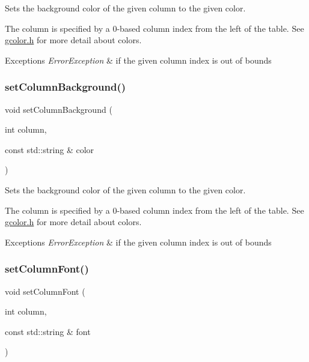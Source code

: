 Sets the background color of the given column to the given color. 

The column is specified by a 0-\/based column index from the left of the table. See \mbox{\hyperlink{gcolor_8h_source}{gcolor.\+h}} for more detail about colors. 
\begin{DoxyExceptions}{Exceptions}
{\em Error\+Exception} & if the given column index is out of bounds \\
\hline
\end{DoxyExceptions}
\mbox{\label{classGTable_a37fd3b921a5fba28b84dd4dd17fa9930}} 
\subsubsection{\texorpdfstring{set\+Column\+Background()}{setColumnBackground()}\hspace{0.1cm}{\footnotesize\ttfamily [2/2]}}
{\footnotesize\ttfamily void set\+Column\+Background (\begin{DoxyParamCaption}\item[{int}]{column,  }\item[{const std\+::string \&}]{color }\end{DoxyParamCaption})\hspace{0.3cm}{\ttfamily [virtual]}}



Sets the background color of the given column to the given color. 

The column is specified by a 0-\/based column index from the left of the table. See \mbox{\hyperlink{gcolor_8h_source}{gcolor.\+h}} for more detail about colors. 
\begin{DoxyExceptions}{Exceptions}
{\em Error\+Exception} & if the given column index is out of bounds \\
\hline
\end{DoxyExceptions}
\mbox{\label{classGTable_a0294ee7cb1af024bc77371f27d877164}} 
\subsubsection{\texorpdfstring{set\+Column\+Font()}{setColumnFont()}}
{\footnotesize\ttfamily void set\+Column\+Font (\begin{DoxyParamCaption}\item[{int}]{column,  }\item[{const std\+::string \&}]{font }\end{DoxyParamCaption})\hspace{0.3cm}{\ttfamily [virtual]}}



